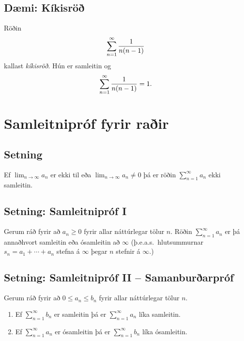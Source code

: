 \documentclass[a4paper,10pt,icelandic]{sphinxmanual}
\begin{document}
\subsection{Dæmi: Kíkisröð}
\label{kafli09:index-8}\label{kafli09:daemi-kikisro}
Röðin
\begin{gather}
\begin{split}\sum_{n=1}^\infty \frac{1}{n(n-1)}\end{split}\notag
\end{gather}
kallast \emph{kíkisröð}. Hún er samleitin og
\begin{gather}
\begin{split}\sum_{n=1}^\infty \frac{1}{n(n-1)} =1.\end{split}\notag
\end{gather}

\section{Samleitnipróf fyrir raðir}
\label{kafli09:index-9}\label{kafli09:samleitniprof-fyrir-rair}

\subsection{Setning}
\label{kafli09:id9}
Ef \(\lim_{n\rightarrow\infty}a_n\) er ekki til eða
\(\lim_{n\rightarrow\infty}a_n\neq 0\) þá er röðin
\(\sum_{n=1}^\infty a_n\) ekki samleitin.


\subsection{Setning: Samleitnipróf I}
\label{kafli09:setning-samleitniprof-i}
Gerum ráð fyrir að \(a_n\geq 0\) fyrir allar náttúrlegar tölur
\(n\). Röðin \(\sum_{n=1}^\infty a_n\) er þá annaðhvort
samleitin eða ósamleitin að \(\infty\) (þ.e.a.s. hlutsummurnar
\(s_n=a_1+\cdots+a_n\) stefna á \(\infty\) þegar \(n\)
stefnir á \(\infty\).)


\subsection{Setning: Samleitnipróf II – Samanburðarpróf}
\label{kafli09:setning-samleitniprof-ii-samanburarprof}
Gerum ráð fyrir að \(0\leq a_n\leq b_n\) fyrir allar náttúrlegar
tölur \(n\).
\begin{enumerate}
\item {} 
Ef \(\sum_{n=1}^\infty b_n\) er samleitin þá er
\(\sum_{n=1}^\infty a_n\) líka samleitin.

\item {} 
Ef \(\sum_{n=1}^\infty a_n\) er ósamleitin þá er
\(\sum_{n=1}^\infty b_n\) líka ósamleitin.

\end{enumerate}
\end{document}
